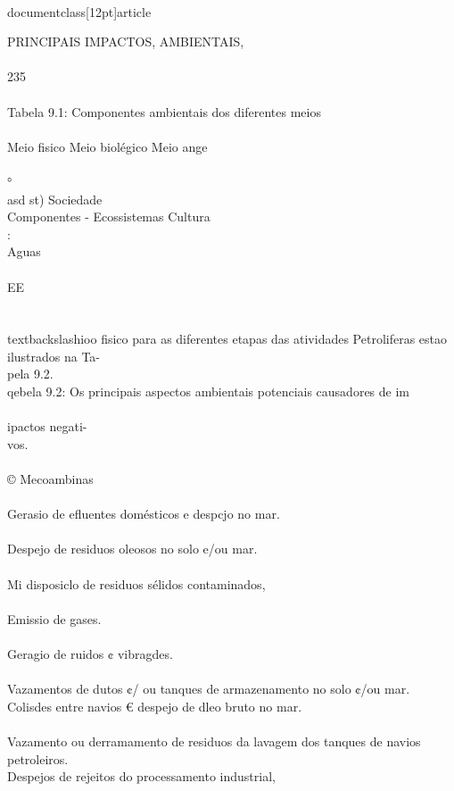 \\documentclass[12pt]{article}
\begin{document}
PRINCIPAIS IMPACTOS, AMBIENTAIS,\\
\\
235\\
\\
Tabela 9.1: Componentes ambientais dos diferentes meios\\
\\
Meio fisico Meio biolégico Meio ange\\
\\
°\\
asd st) Sociedade\\
Componentes - Ecossistemas Cultura\\
:\\
Aguas\\
\\
EE\\
\\
\\textbackslash{}ioo fisico para as diferentes etapas das atividades Petroliferas estao ilustrados na Ta-\\
pela 9.2.\\
qebela 9.2: Os principais aspectos ambientais potenciais causadores de im\\
\\
ipactos negati-\\
vos.\\
\\
© Mecoambinas\\
\\
Gerasio de efluentes domésticos e despcjo no mar.\\
\\
Despejo de residuos oleosos no solo e/ou mar.\\
\\
Mi disposiclo de residuos sélidos contaminados,\\
\\
Emissio de gases.\\
\\
Geragio de ruidos ¢ vibragdes.\\
\\
Vazamentos de dutos ¢/ ou tanques de armazenamento no solo ¢/ou mar.\\
Colisdes entre navios € despejo de dleo bruto no mar.\\
\\
Vazamento ou derramamento de residuos da lavagem dos tanques de navios petroleiros.\\
Despejos de rejeitos do processamento industrial,\\
\end{document}
